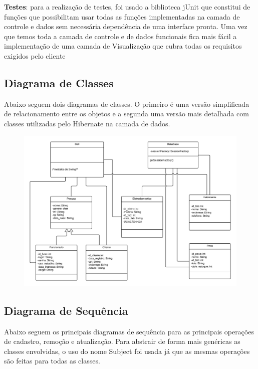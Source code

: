 \documentclass[a4paper,10pt]{article}
\begin{document}
\textbf{Testes}: para a realização de testes, foi usado a biblioteca jUnit que constitui de funções que possibilitam usar todas as funções implementadas na camada de controle e dados sem necessária dependência de uma interface pronta. Uma vez que temos toda a camada de controle e de dados funcionais fica mais fácil a implementação de uma camada de Visualização que cubra todas os requisitos exigidos pelo cliente

\subsection{Diagrama de Classes}

Abaixo seguem dois diagramas de classes. O primeiro é uma versão simplificada de relacionamento entre os objetos e a segunda uma versão mais detalhada com classes utilizadas pelo Hibernate na camada de dados.

\begin{figure}[H]
\centering
\includegraphics[width=1\textwidth]{pic/classe_1.png}
\end{figure}



\subsection{Diagrama de Sequência}


Abaixo seguem os principais diagramas de sequência para as principais operações de cadastro, remoção e atualização. Para abstrair de forma mais genéricas as classes envolvidas, o uso do nome Subject foi usada já que as mesmas operações são feitas para todas as classes.
\end{document}

